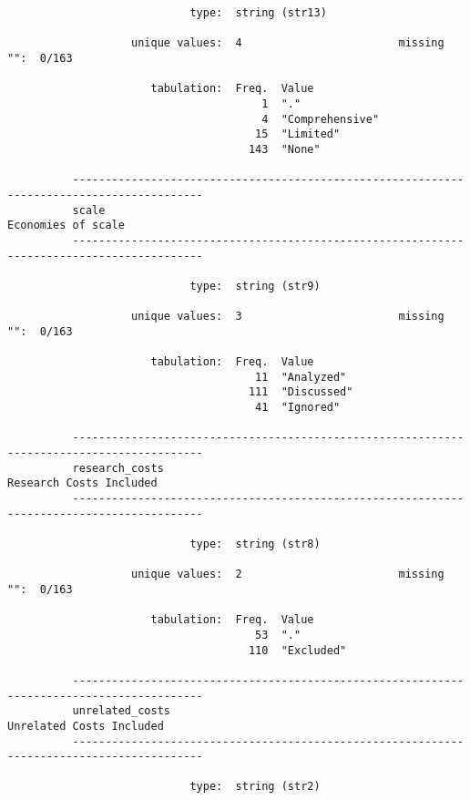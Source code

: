 \documentclass{article}
\begin{document}
\begin{verbatim}
                            type:  string (str13)
          
                   unique values:  4                        missing "":  0/163
          
                      tabulation:  Freq.  Value
                                       1  "."
                                       4  "Comprehensive"
                                      15  "Limited"
                                     143  "None"
          
          ------------------------------------------------------------------------------------------
          scale                                                                   Economies of scale
          ------------------------------------------------------------------------------------------
          
                            type:  string (str9)
          
                   unique values:  3                        missing "":  0/163
          
                      tabulation:  Freq.  Value
                                      11  "Analyzed"
                                     111  "Discussed"
                                      41  "Ignored"
          
          ------------------------------------------------------------------------------------------
          research_costs                                                     Research Costs Included
          ------------------------------------------------------------------------------------------
          
                            type:  string (str8)
          
                   unique values:  2                        missing "":  0/163
          
                      tabulation:  Freq.  Value
                                      53  "."
                                     110  "Excluded"
          
          ------------------------------------------------------------------------------------------
          unrelated_costs                                                   Unrelated Costs Included
          ------------------------------------------------------------------------------------------
          
                            type:  string (str2)
          

\end{verbatim}
\end{document}
